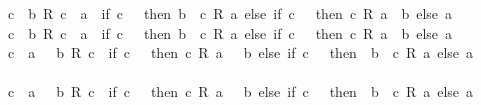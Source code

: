 \begin{isabellebody}
\ \ {\isachardoublequoteopen}{}\ {\isacharless}{\kern0pt}\ c\ {\isasymLongrightarrow}\ b\ {\isacharslash}{\kern0pt}\isactrlsub R\ c\ {\isasymle}\ a\ {\isasymlongleftrightarrow}\ {\isacharparenleft}{\kern0pt}if\ c\ {\isachargreater}{\kern0pt}\ {}\ then\ b\ {\isasymle}\ c\ {\isacharasterisk}{\kern0pt}\isactrlsub R\ a\ else\ if\ c\ {\isacharless}{\kern0pt}\ {}\ then\ c\ {\isacharasterisk}{\kern0pt}\isactrlsub R\ a\ {\isasymle}\ b\ else\ a\ {\isasymge}\ {}{\isacharparenright}{\kern0pt}{\isachardoublequoteclose}\isanewline
\ \ {\isachardoublequoteopen}{}\ {\isacharless}{\kern0pt}\ c\ {\isasymLongrightarrow}\ b\ {\isacharslash}{\kern0pt}\isactrlsub R\ c\ {\isacharless}{\kern0pt}\ a\ {\isasymlongleftrightarrow}\ {\isacharparenleft}{\kern0pt}if\ c\ {\isachargreater}{\kern0pt}\ {}\ then\ b\ {\isacharless}{\kern0pt}\ c\ {\isacharasterisk}{\kern0pt}\isactrlsub R\ a\ else\ if\ c\ {\isacharless}{\kern0pt}\ {}\ then\ c\ {\isacharasterisk}{\kern0pt}\isactrlsub R\ a\ {\isacharless}{\kern0pt}\ b\ else\ a\ {\isachargreater}{\kern0pt}\ {}{\isacharparenright}{\kern0pt}{\isachardoublequoteclose}\isanewline
\ \ {\isachardoublequoteopen}{}\ {\isacharless}{\kern0pt}\ c\ {\isasymLongrightarrow}\ a\ {\isasymle}\ {\isacharminus}{\kern0pt}\ {\isacharparenleft}{\kern0pt}b\ {\isacharslash}{\kern0pt}\isactrlsub R\ c{\isacharparenright}{\kern0pt}\ {\isasymlongleftrightarrow}\ {\isacharparenleft}{\kern0pt}if\ c\ {\isachargreater}{\kern0pt}\ {}\ then\ c\ {\isacharasterisk}{\kern0pt}\isactrlsub R\ a\ {\isasymle}\ {\isacharminus}{\kern0pt}\ b\ else\ if\ c\ {\isacharless}{\kern0pt}\ {}\ then\ {\isacharminus}{\kern0pt}\ b\ {\isasymle}\ c\ {\isacharasterisk}{\kern0pt}\isactrlsub R\ a\ else\ a\ {\isasymle}\ {}{\isacharparenright}{\kern0pt}{\isachardoublequoteclose}\isanewline
\ \ {\isachardoublequoteopen}{}\ {\isacharless}{\kern0pt}\ c\ {\isasymLongrightarrow}\ a\ {\isacharless}{\kern0pt}\ {\isacharminus}{\kern0pt}\ {\isacharparenleft}{\kern0pt}b\ {\isacharslash}{\kern0pt}\isactrlsub R\ c{\isacharparenright}{\kern0pt}\ {\isasymlongleftrightarrow}\ {\isacharparenleft}{\kern0pt}if\ c\ {\isachargreater}{\kern0pt}\ {}\ then\ c\ {\isacharasterisk}{\kern0pt}\isactrlsub R\ a\ {\isacharless}{\kern0pt}\ {\isacharminus}{\kern0pt}\ b\ else\ if\ c\ {\isacharless}{\kern0pt}\ {}\ then\ {\isacharminus}{\kern0pt}\ b\ {\isacharless}{\kern0pt}\ c\ {\isacharasterisk}{\kern0pt}\isactrlsub R\ a\ else\ a\ {\isacharless}{\kern0pt}\ {}{\isacharparenright}{\kern0pt}{\isachardoublequoteclose}\isanewline

\end{isabellebody}
